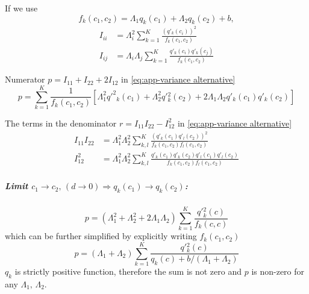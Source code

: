 If we use 
%
\begin{equation}
	f_k(c_1,c_2)=\Lambda_1q_k(c_1)+\Lambda_2q_k(c_2)+b,
\end{equation}
%
\begin{equation}
	\begin{aligned}I_{ii} & =\Lambda_i^2\sum_{k=1}^K\frac{\left(q'_k(c_i)\right)^2}{f_k(c_1,c_2)}\\
		I_{ij} & =\Lambda_i\Lambda_j\sum_{k=1}^K\frac{q'_k(c_i)q'_k(c_j)}{f_k(c_1,c_2)}
	\end{aligned}
	\label{eq:app-Fisher Information alternative - Individual}
\end{equation}
 
Numerator $p=I_{11}+I_{22}+2I_{12}$ in \autoref{eq:app-variance alternative}
\begin{equation}
	p=\sum_{k=1}^K\frac{1}{f_k(c_1,c_2)}\left[\Lambda_1^2q'^2{}_k(c_1)+\Lambda_2^2q'{}_k^2(c_2)+2\Lambda_1\Lambda_2q'_k(c_1)q'_k(c_2)\right]
\end{equation}

The terms in the denominator $r=I_{11}I_{22}-I_{12}^2$ in \autoref{eq:app-variance alternative}
%
\begin{equation}
	\begin{alignedat}{1}
		I_{11}I_{22} & =\Lambda_1^2\Lambda_2^2\sum_{k,l}^K\frac{\left(q'_k(c_1)q'_l(c_2)\right)^2}{f_k(c_1,c_2)f_l(c_1,c_2)}\\
		I_{12}^2 & =\Lambda_1^2\Lambda_2^2\sum_{k,l}^K\frac{q'_k(c_1)q'_k(c_2)q'_l(c_1)q'_l(c_2)}{f_k(c_1,c_2)f_l(c_1,c_2)}
	\end{alignedat}
\end{equation}

\subparagraph*{Limit $c_1\rightarrow c_2,\,(d\rightarrow0)\Rightarrow q_k(c_1)\rightarrow q_k(c_2)$:}
%
\begin{equation}
	p=(\Lambda_1^2+\Lambda_2^2+2\Lambda_1\Lambda_2)\sum_{k=1}^K\frac{q'{}_k^2(c)}{f_k(c,c)}
\end{equation}
%
which can be further simplified by explicitly writing $f_k(c_1,c_2)$
%
\begin{equation}
	p=(\Lambda_1+\Lambda_2)\sum_{k=1}^K\frac{q'{}_k^2(c)}{q_k(c)+b/(\Lambda_1+\Lambda_2)}
\end{equation}
%
$q_k$ is strictly positive function, therefore the sum is not zero and $p$ is non-zero for any $\Lambda_1,\,\Lambda_2$. 

